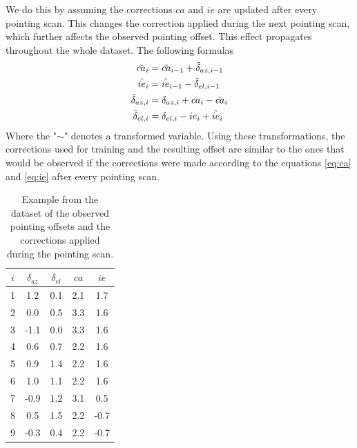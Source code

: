 We do this by assuming the corrections $ca$ and $ie$ are updated after every pointing scan.
This changes the correction applied during the next pointing scan, which further affects the observed pointing offset.
This effect propagates throughout the whole dataset.
The following formulas 
\begin{align}
    \Tilde{ca}_i &= \Tilde{ca}_{i-1} + \Tilde{\delta}_{az,i-1}\label{eq:ca_tilde}\\
    \Tilde{ie}_i &= \Tilde{ie}_{i-1} - \Tilde{\delta}_{el,i-1\label{eq:ie_tilde}}\\
    \Tilde{\delta}_{az,i} &= \delta_{az,i} + ca_i - \Tilde{ca}_i\label{eq:off_az_tilde}\\
    \Tilde{\delta}_{el,i} &= \delta_{el,i} - ie_i + \Tilde{ie}_i\label{eq:off_el_tilde}
\end{align}
Where the "$\sim$" denotes a transformed variable.
Using these transformations,
the corrections used for training and the resulting offset are similar to the ones that would be observed if the corrections were made according to the equations
\eqref{eq:ca} and \eqref{eq:ie} after every pointing scan.


\begin{table}[H]
    \centering
    \caption{Example from the dataset of the observed pointing offsets and the corrections applied during the pointing scan.}
    \label{tab:offset_and_correction}
    \begin{tabular}{ccccc}
    \toprule
    $i$ &  $\delta_{az}$ &  $\delta_{el}$ &  $ca$ & $ie$  \\
    \midrule
    1 & 1.2 & 0.1 & 2.1 &  1.7 \\
    2 &     0.0 & 0.5 & 3.3 &  1.6 \\
    3 &    -1.1 & 0.0 & 3.3 &  1.6 \\
    4 &     0.6 & 0.7 & 2.2 &  1.6 \\
    5 &     0.9 & 1.4 & 2.2 &  1.6 \\
    6 &     1.0 & 1.1 & 2.2 &  1.6 \\
    7 &    -0.9 & 1.2 & 3.1 &  0.5 \\
    8 &     0.5 & 1.5 & 2.2 & -0.7 \\
    9 &    -0.3 & 0.4 & 2.2 & -0.7 \\
    \bottomrule
    \end{tabular}
\end{table}


